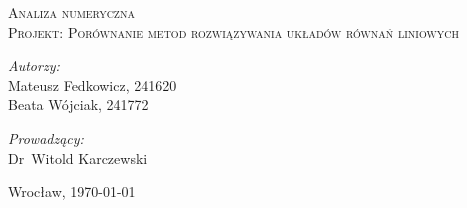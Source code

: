 \documentclass[a4paper]{article}
\begin{document}
\begin{titlepage}
\vspace*{\fill}
 \begin{center}

  \textsc{\LARGE Analiza numeryczna}\\[2.0cm]
  \textsc{\Large Projekt: Porównanie metod rozwiązywania układów równań liniowych}\\[1.5cm] 

\vspace*{\fill}
  \begin{minipage}{0.4\textwidth}
    \begin{flushleft} \large
    \emph{Autorzy:}\\
    Mateusz Fedkowicz, 241620 \\ Beata Wójciak, 241772
    \end{flushleft}
    \end{minipage}
    \begin{minipage}{0.4\textwidth}
    \begin{flushright} \large
    \emph{Prowadzący:} \\
    Dr~Witold Karczewski
    \end{flushright}
  \end{minipage}
\vspace*{\fill}

{\large Wrocław, \today}
 \end{center}
\end{titlepage}

\newpage
\tableofcontents
\newpage
\end{document}
